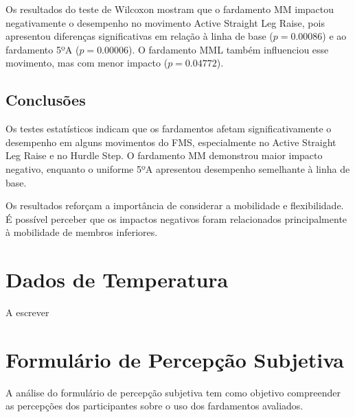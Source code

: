 Os resultados do teste de Wilcoxon mostram que o fardamento \acrlong{MM} impactou negativamente o desempenho no movimento Active Straight Leg Raise, pois apresentou diferenças significativas em relação à linha de base ($p = 0.00086$) e ao fardamento 5ºA ($p = 0.00006$). O fardamento \acrlong{MML} também influenciou esse movimento, mas com menor impacto ($p = 0.04772$).

\subsection{Conclusões}
Os testes estatísticos indicam que os fardamentos afetam significativamente o desempenho em alguns movimentos do \acrshort{FMS}, especialmente no Active Straight Leg Raise e no Hurdle Step. O fardamento \acrlong{MM} demonstrou maior impacto negativo, enquanto o uniforme 5ºA apresentou desempenho semelhante à linha de base.

\tab Os resultados reforçam a importância de considerar a mobilidade e flexibilidade. É possível perceber que os impactos negativos foram relacionados principalmente à mobilidade de membros inferiores.

\section{Dados de Temperatura}


A escrever



\section{Formulário de Percepção Subjetiva}
A análise do formulário de percepção subjetiva tem como objetivo compreender as percepções dos participantes sobre o uso dos fardamentos avaliados. 


